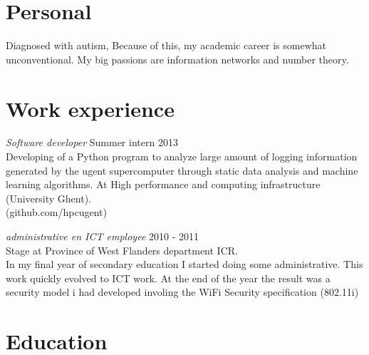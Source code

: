 \documentclass[margin, 10pt]{res} %
\begin{document}
\begin{resume}

 
\section{Personal}
Diagnosed with autism, Because of this, my academic career is somewhat unconventional. My big passions are information networks and number theory.
\section{Work experience}
{\sl Software developer} \hfill Summer intern 2013 \\
Developing of a Python program to analyze large amount of logging information generated by the ugent supercomputer through static data analysis and machine learning algorithms.
At High performance and computing infrastructure (University Ghent).\\ (github.com/hpcugent)

{\sl administrative en ICT employee} \hfill 2010 - 2011 \\
Stage at Province of West Flanders department ICR. \\
In my final year of secondary education I started doing some administrative. This work quickly evolved to ICT work. At the end of the year the result was a security model i had developed involing the WiFi Security specification (802.11i)

\section{Education}


\end{resume}
\end{document}
